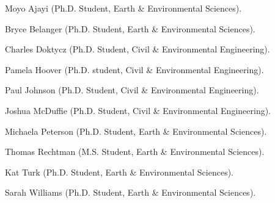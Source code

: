 \item Moyo Ajayi (Ph.D. Student, Earth \& Environmental Sciences).
\item Bryce Belanger (Ph.D. Student, Earth \& Environmental Sciences).
\item Charles Doktycz (Ph.D. Student, Civil \& Environmental Engineering).
\item Pamela Hoover (Ph.D. student, Civil \& Environmental Engineering).
\item Paul Johnson (Ph.D. Student, Civil \& Environmental Engineering).
\item Joshua McDuffie (Ph.D. Student, Civil \& Environmental Engineering).
\item Michaela Peterson (Ph.D. Student, Earth \& Environmental Sciences).
\item Thomas Rechtman (M.S. Student, Earth \& Environmental Sciences).
\item Kat Turk (Ph.D. Student, Earth \& Environmental Sciences).
\item Sarah Williams (Ph.D. Student, Earth \& Environmental Sciences).
